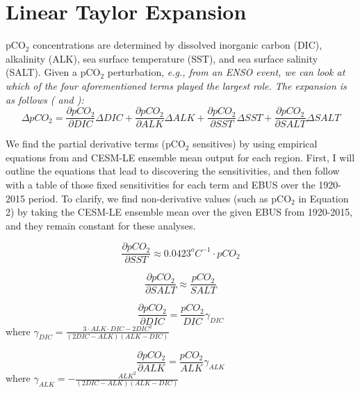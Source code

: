 \documentclass[12pt]{article}
\begin{document}
\newpage
\section{Linear Taylor Expansion}
pCO$_{2}$ concentrations are determined by dissolved inorganic carbon (DIC), alkalinity (ALK), sea surface temperature (SST), and sea surface salinity (SALT). Given a pCO$_{2}$ perturbation, \it e.g.\rm, from an ENSO event, we can look at which of the four aforementioned terms played the largest role. The expansion is as follows (\citet{Lovenduski2007} and \citet{Lovenduski2015}):
\begin{equation}
	\Delta pCO_{2} = \frac{\partial pCO_{2}}{\partial DIC}\Delta DIC + \frac{\partial pCO_{2}}{\partial ALK}\Delta ALK + \frac{\partial pCO_{2}}{\partial SST}\Delta SST + \frac{\partial pCO_{2}}{\partial SALT}\Delta SALT
\end{equation}

We find the partial derivative terms (pCO$_{2}$ sensitives) by using empirical equations from \citet{Takahashi1993} and CESM-LE ensemble mean output for each region. First, I will outline the equations that lead to discovering the sensitivities, and then follow with a table of those fixed sensitivities for each term and EBUS over the 1920-2015 period. To clarify, we find non-derivative values (such as pCO$_{2}$ in Equation 2) by taking the CESM-LE ensemble mean over the given EBUS from 1920-2015, and they remain constant for these analyses.

\begin{equation}
	\frac{\partial pCO_{2}}{\partial SST} \approx 0.0423^{o}C^{-1}\cdot pCO_{2}
\end{equation}

\begin{equation}
	\frac{\partial pCO_{2}}{\partial SALT} \approx \frac{pCO_{2}}{SALT}
\end{equation}

\begin{equation}
	\frac{\partial pCO_{2}}{\partial DIC} = \frac{pCO_{2}}{DIC}\gamma_{DIC}
\end{equation}
where $ \gamma_{DIC} = \frac{3\cdot ALK\cdot DIC - 2DIC^{2}}{(2DIC - ALK)(ALK - DIC)} $

\begin{equation}
	\frac{\partial pCO_{2}}{\partial ALK} = \frac{pCO_{2}}{ALK}\gamma_{ALK}
\end{equation}
where $ \gamma_{ALK} = -\frac{ALK^{2}}{(2DIC - ALK)(ALK-DIC)} $
\end{document}
